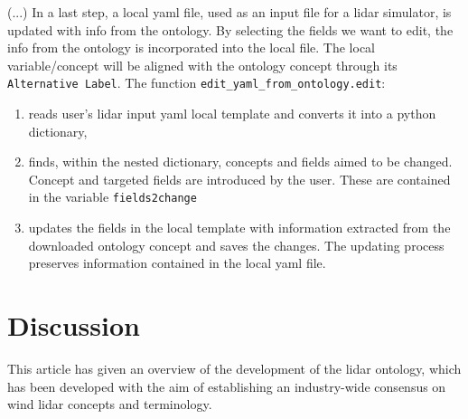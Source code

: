 \documentclass[remotesensing,article,submit,pdftex,moreauthors]{Definitions/mdpi}
\begin{document}
(...) In a last step, a local yaml file, used as an input file for a lidar simulator, is updated with info from the ontology. By selecting the fields we want to edit, the info from the ontology is incorporated into the local file. The local variable/concept will be aligned with the ontology concept through its \texttt{Alternative Label}. The function  \texttt{edit\_yaml\_from\_ontology.edit}:
\begin{enumerate}
    \item reads user's lidar input yaml local template and converts it into a python dictionary,
    \item finds, within the nested dictionary, concepts and fields aimed to be changed. Concept and targeted fields are introduced by the user. These are contained in the variable \texttt{fields2change}
    \item updates the fields in the local template with information extracted from the downloaded ontology concept and saves the changes. The updating process preserves information contained in the local yaml file. 
    
\end{enumerate} 






\section{Discussion}
\label{sec:Discussion}
This article has given an overview of the development of the lidar ontology, which has been developed with the aim of establishing an industry-wide consensus on wind lidar concepts and terminology.
\end{document}
